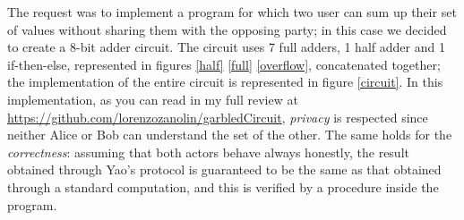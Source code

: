 \documentclass[12pt]{article}
\begin{document}
The request was to implement a program for which two user can sum up their set of values without sharing them with the opposing party; in this case we decided to create a 8-bit adder circuit.
The circuit uses 7 full adders, 1 half adder and 1 if-then-else, represented in figures \ref{half} \ref{full} \ref{overflow}, concatenated together; the implementation of the entire circuit is represented in figure \ref{circuit}.
In this implementation, as you can read in my full review at \url{https://github.com/lorenzozanolin/garbledCircuit}\label{zanoGit}, \textit{privacy} is respected since neither Alice or Bob can understand the set of the other. The same holds for the \textit{correctness}: assuming that both actors behave always honestly, the result obtained through Yao's protocol is guaranteed to be the same as that obtained through a standard computation, and this is verified by a procedure inside the program.
\end{document}
